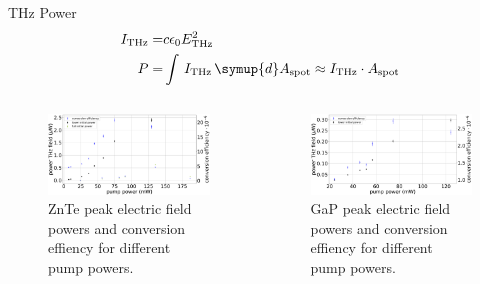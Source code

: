 \documentclass[aspectratio=1610, 9pt]{beamer}
\begin{document}
\begin{frame}{THz Power}
 \nocite{griffiths}
  \begin{align}
    I_\text{THz} =& c \epsilon_0 E_\text{THz}^2 \\
    P =& \int\, I_\text{THz} \,\symup{d}A_\text{spot} \approx I_\text{THz}\cdot A_\text{spot}
\end{align}
  \begin{columns}
    \begin{column}{.5\textwidth}
  \begin{figure}
    \includegraphics[width=\textwidth]{images/Powerznte.pdf}
    \caption{ZnTe \textcolor{tugreen}{peak electric field powers} and \textcolor{tugreen}{conversion effiency} for different pump powers.}
  \end{figure}
  \end{column}
  \begin{column}{.5\textwidth}
    \begin{figure}
      \includegraphics[width=\textwidth]{images/Powergap.pdf}
      \caption{GaP \textcolor{tugreen}{peak electric field powers} and \textcolor{tugreen}{conversion effiency} for different pump powers.}
    \end{figure}    
  \end{column}
  \end{columns}
\end{frame}
\end{document}
